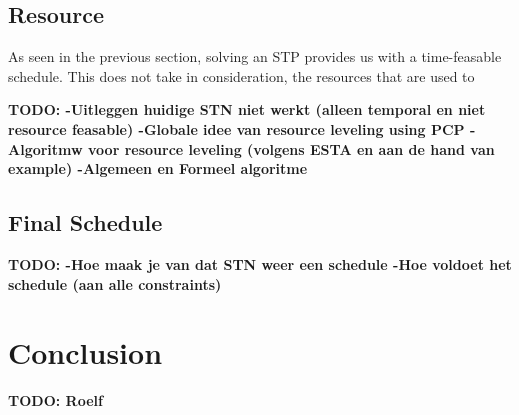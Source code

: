 \documentclass{article}
\theoremstyle{definition}
\newcommand{\TODO}[1]{{\color{red}\textbf{TODO: #1}}}
\begin{document}
\subsection{Resource}
As seen in the previous section, solving an STP provides us with a time-feasable schedule. This does not take in consideration, the resources that are used to 

\TODO{
		-Uitleggen huidige STN niet werkt (alleen temporal en niet resource feasable)
		-Globale idee van resource leveling using PCP
		-Algoritmw voor resource leveling (volgens ESTA en aan de hand van example)
		-Algemeen en Formeel algoritme
		}

\subsection{Final Schedule}

\TODO{
		-Hoe maak je van dat STN weer een schedule
		-Hoe voldoet het schedule (aan alle constraints)
}

\newpage

\section{Conclusion}
\TODO{Roelf}



\newpage


\end{document}
